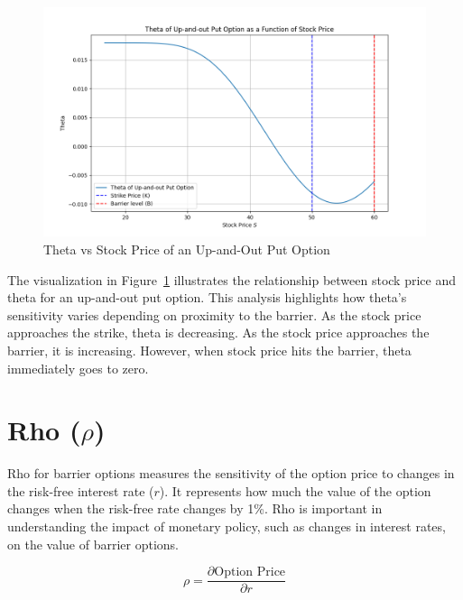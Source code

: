 \begin{figure}[H]
    \centering
    \includegraphics[width=.65\linewidth]{content/images/theta.png}
    \caption{Theta vs Stock Price of an Up-and-Out Put Option}
    \label{fig:theta_behavior}
\end{figure}


The visualization in Figure~\ref{fig:theta_behavior} illustrates the relationship between stock price and theta for an up-and-out put option. This analysis highlights how theta's sensitivity varies depending on proximity to the barrier. As the stock price approaches the strike, theta is decreasing. As the stock price approaches the barrier, it is increasing. However, when stock price hits the barrier, theta immediately goes to zero.


\section{Rho (\(\rho\))}

Rho for barrier options measures the sensitivity of the option price to changes in the risk-free interest rate (\(r\)). It represents how much the value of the option changes when the risk-free rate changes by 1\%. Rho is important in understanding the impact of monetary policy, such as changes in interest rates, on the value of barrier options.

\[
\rho = \frac{\partial \text{Option Price}}{\partial r}
\]


